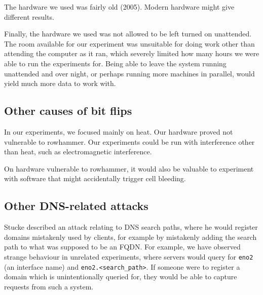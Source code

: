 \documentclass[conference]{IEEEtran}
\begin{document}
The hardware we used was fairly old (2005). Modern hardware might give
different results.

Finally, the hardware we used was not allowed to be left turned on unattended.
The room available for our experiment was unsuitable for doing work other than
attending the computer as it ran, which severely limited how many hours we were
able to run the experiments for. Being able to leave the system running
unattended and over night, or perhaps running more machines in parallel, would
yield much more data to work with.


\subsection{Other causes of bit flips}

In our experiments, we focused mainly on heat. Our hardware proved not
vulnerable to rowhammer. Our experiments could be run with interference other
than heat, such as electromagnetic interference.

On hardware vulnerable to rowhammer, it would also be valuable to experiment
with software that might accidentally trigger cell bleeding.

\subsection{Other DNS-related attacks}

Stucke\cite{suffixpath} described an attack relating to DNS search paths, where
he would register domains mistakenly used by clients, for example by mistakenly
adding the search path to what was supposed to be an FQDN. For example, we have
observed strange behaviour in unrelated experiments, where servers would query
for \texttt{eno2} (an interface name) and \texttt{eno2.<search\_path>}. If
someone were to register a domain which is unintentionally queried for, they
would be able to capture requests from such a system.


\printbibliography


\end{document}
